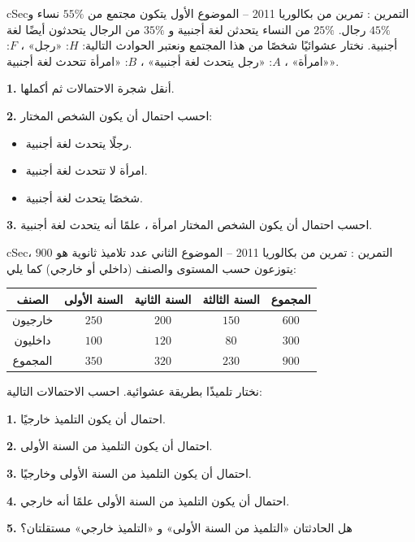 \documentclass[12pt,a4paper]{article}
\newenvironment{BOX}[2]{\begin{otherlanguage}{english}\begin{arbox}{#1}{#2}}{\end{arbox}\end{otherlanguage}}
\newcounter{exo}
\newenvironment{tamrin}[1]{\stepcounter{exo}\begin{BOX}{cSec}{التمرين \theexo: #1}}{\end{BOX}}
\newenvironment{LTR}{\begin{otherlanguage}{english}}{\end{otherlanguage}}
\newcommand{\ar}[1]{\foreignlanguage{arabic}{#1}}
\renewcommand{\ldots}{\mathinner{\ldotp\ldotp\ldotp}}
\newenvironment{sq}{\begin{itemize}[leftmargin=2.4em,itemsep=3pt]}{\end{itemize}}
\newcommand{\qa}{\item[(أ)]}\newcommand{\qb}{\item[(ب)]}\newcommand{\qc}{\item[(جـ)]}\newcommand{\qd}{\item[(د)]}\newcommand{\qe}{\item[(هـ)]}
\newcommand{\QQ}[1]{\par\smallskip\textbf{#1.} }
\begin{document}
\begin{tamrin}{تمرين من بكالوريا 2011 -- الموضوع الأول}
يتكون مجتمع من $55\%$ نساء و $45\%$ رجال. $25\%$ من النساء يتحدثن لغة أجنبية و $35\%$ من الرجال يتحدثون أيضًا لغة أجنبية. نختار عشوائيًا شخصًا من هذا المجتمع ونعتبر الحوادث التالية: $H$: «رجل» ، $F$: «امرأة» ، $A$: «رجل يتحدث لغة أجنبية» ، $B$: «امرأة تتحدث لغة أجنبية».
\QQ{1} أنقل شجرة الاحتمالات ثم أكملها.
\QQ{2} احسب احتمال أن يكون الشخص المختار:
\begin{sq}
\qa رجلًا يتحدث لغة أجنبية.
\qb امرأة لا تتحدث لغة أجنبية.
\qc شخصًا يتحدث لغة أجنبية.
\end{sq}
\QQ{3} احسب احتمال أن يكون الشخص المختار امرأة ، علمًا أنه يتحدث لغة أجنبية.
\par\begin{center}\begin{LTR}\end{LTR}\end{center}
\end{tamrin}
\begin{tamrin}{تمرين من بكالوريا 2011 -- الموضوع الثاني}
عدد تلاميذ ثانوية هو $900$ ، يتوزعون حسب المستوى والصنف (داخلي أو خارجي) كما يلي:
\begin{center}\begin{LTR}\renewcommand{\arraystretch}{1.4}
\begin{tabular}{|C|c|c|c|c|}\hline
{}الصنف & \ar{السنة الأولى} & \ar{السنة الثانية} & \ar{السنة الثالثة} & \ar{المجموع}\\\hline
خارجيون & $250$ & $200$ & $150$ & $600$\\\hline
داخليون & $100$ & $120$ & $80$ & $300$\\\hline
المجموع & $350$ & $320$ & $230$ & $900$\\\hline
\end{tabular}\end{LTR}\end{center}
نختار تلميذًا بطريقة عشوائية. احسب الاحتمالات التالية:
\QQ{1} احتمال أن يكون التلميذ خارجيًا.
\QQ{2} احتمال أن يكون التلميذ من السنة الأولى.
\QQ{3} احتمال أن يكون التلميذ من السنة الأولى وخارجيًا.
\QQ{4} احتمال أن يكون التلميذ من السنة الأولى علمًا أنه خارجي.
\QQ{5} هل الحادثتان «التلميذ من السنة الأولى» و «التلميذ خارجي» مستقلتان؟
\end{tamrin}
\end{document}
